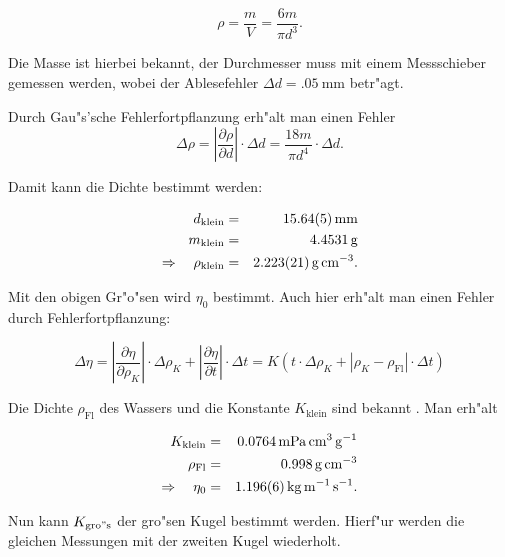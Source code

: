 		\begin{equation*}
			\rho = \frac{m}{V} = \frac{6 m}{\pi d^3} .
		\end{equation*}

		Die Masse ist hierbei bekannt, der Durchmesser muss mit einem Messschieber gemessen werden, wobei der Ablesefehler $\Delta d = \SI{.05}{\milli \meter}$ betr"agt.

		Durch Gau"s'sche Fehlerfortpflanzung erh"alt man einen Fehler 
		\begin{equation*}
			\Delta \rho = \left| \frac{\partial \rho}{\partial d} \right| \cdot \Delta d = \frac{18m}{\pi d^4} \cdot \Delta d .
		\end{equation*}

		Damit kann die Dichte bestimmt werden:

		\begin{eqnarray*}
			d_\mathrm{klein} & = & \SI{15.64 (5)}{\milli \meter} \\ 
			m_\mathrm{klein} & = & \SI{4.4531}{\gram} \\
			\Rightarrow \quad \rho_\mathrm{klein} & = & \SI{2.223 (21)}{\gram \per \centi \meter \cubed} .
		\end{eqnarray*}

		Mit den obigen Gr"o"sen wird $\eta_0$ bestimmt.
		Auch hier erh"alt man einen Fehler durch Fehlerfortpflanzung:

		\begin{equation*}
			\label{fehler_eta}
			\Delta \eta = \left| \frac{\partial \eta}{\partial \rho_K} \right| \cdot \Delta \rho_K + \left| \frac{\partial \eta}{\partial t} \right| \cdot \Delta t = K \left(t \cdot \Delta \rho_K + \left|\rho_K - \rho_\mathrm{Fl}\right| \cdot \Delta t \right)
		\end{equation*}

		Die Dichte $\rho_\mathrm{Fl}$ des Wassers und die Konstante $K_\mathrm{klein}$ sind bekannt \cite{uni_magdeburg} \cite{anleitung} . Man erh"alt

		\begin{eqnarray*}
			K_\mathrm{klein} & = & \SI{.0764}{\milli \pascal \centi \meter \cubed \per \gram} \\
			\rho_\mathrm{Fl} & = & \SI{.998}{\gram \per \centi \meter \cubed}\\
			\Rightarrow \quad \eta_0 & = & \SI{1.196 (6)}{\kilo \gram \per \meter \per \second} .
		\end{eqnarray*}

		Nun kann $K_\mathrm{gro"s}$ der gro"sen Kugel bestimmt werden.
		Hierf"ur werden die gleichen Messungen mit der zweiten Kugel wiederholt.

